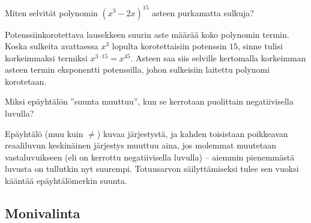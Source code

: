 \begin{multicols}{2}
\begin{tehtava}
Miten selvität polynomin $(x^3-2x)^{15}$ asteen purkamatta sulkuja?
	\begin{vastaus}
Potenssiinkorotettava lausekkeen suurin aste määrää koko polynomin termin. Koska sulkeita avattaessa $x^3$ lopulta korotettaisiin potenssin $15$, sinne tulisi korkeimmaksi termiksi $x^{3\cdot 15}=x^{45}$. Asteen saa siis selville kertomalla korkeimman asteen termin eksponentti potenssilla, johon sulkeisiin laitettu polynomi korotetaan.
	\end{vastaus}
\end{tehtava}

\begin{tehtava}
Miksi epäyhtälön ''suunta muuttuu'', kun se kerrotaan puolittain negatiivisella luvulla?
	\begin{vastaus}
Epäyhtälö (muu kuin $\neq$) kuvaa järjestystä, ja kahden toisistaan poikkeavan reaaliluvun keskinäinen järjestys muuttuu aina, jos molemmat muutetaan vastaluvuikseen (eli on kerrottu negatiivisella luvulla) -- aiemmin pienemmästä luvusta on tullutkin nyt suurempi. Totuusarvon säilyttämiseksi tulee sen vuoksi kääntää epäyhtälömerkin suunta.
	\end{vastaus}
\end{tehtava}

\end{multicols}

\subsection*{Monivalinta}

